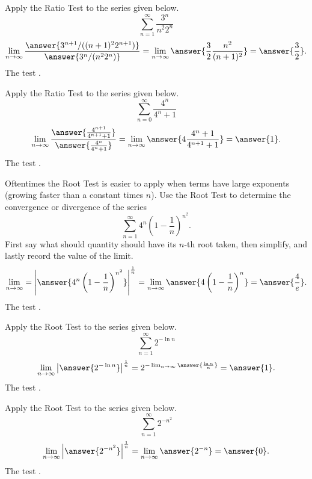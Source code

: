 \documentclass{ximera}
\begin{document}
\begin{exercise}
Apply the Ratio Test to the series given below.
\[ \sum_{n=1}^\infty \frac{3^n}{n^2 2^n} \]
\[ \lim_{n \rightarrow \infty} \frac{\answer{3^{n+1}/((n+1)^2 2^{n+1})}}{\answer{3^n/(n^2 2^n)}} = \lim_{n \rightarrow \infty} \answer{ \frac{3}{2} \frac{n^2}{(n+1)^2}} = \answer{\frac{3}{2}}. \]
The test .
\end{exercise}

\begin{exercise}
Apply the Ratio Test to the series given below.
\[ \sum_{n=0}^\infty \frac{4^n}{4^n+1} \]
\[ \lim_{n \rightarrow \infty} \frac{\answer{\frac{4^{n+1}}{4^{n+1}+1}}}{\answer{\frac{4^n}{4^n+1}}} = \lim_{n \rightarrow \infty} \answer{4 \frac{4^n+1}{4^{n+1}+1}} = \answer{1}. \]
The test .
\end{exercise}

\begin{exercise}
Oftentimes the Root Test is easier to apply when terms have large exponents (growing faster than a constant times $n$). Use the Root Test to determine the convergence or divergence of the series
\[ \sum_{n=1}^\infty 4^n \left( 1 - \frac{1}{n} \right)^{n^2}. \]
First say what should quantity should have its $n$-th root taken, then simplify, and lastly record the value of the limit.
\[ \lim_{n \rightarrow \infty} = \left| \answer{4^n \left( 1 - \frac{1}{n} \right)^{n^2}} \right|^{\frac{1}{n}} = \lim_{n \rightarrow \infty} \answer{4 \left( 1 - \frac{1}{n} \right)^n} = \answer{ \frac{4}{e}}. \]
The test .
\end{exercise}

\begin{exercise}
Apply the Root Test to the series given below.
\[ \sum_{n=1}^\infty  2^{- \ln n} \]
\[ \lim_{n \rightarrow \infty} \left| \answer{2^{-\ln n}} \right|^{\frac{1}{n}} = 2^{- \lim_{n \rightarrow \infty} \answer{\frac{\ln n}{n}}} = \answer{1}. \]
The test .
\end{exercise}

\begin{exercise}
Apply the Root Test to the series given below.
\[ \sum_{n=1}^\infty 2^{-n^2} \]
\[ \lim_{n \rightarrow \infty} \left| \answer{2^{-n^2}} \right|^{\frac{1}{n}} = \lim_{n \rightarrow \infty} \answer{2^{-n}} = \answer{0}. \]
The test .
\end{exercise}
\end{document}
